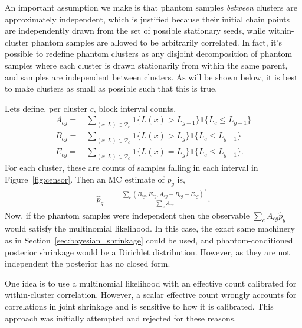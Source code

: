\documentclass[pdflatex,sn-basic,icol]{sn-jnl}
\theoremstyle{plain}
\theoremstyle{definition}
\begin{document}
An important assumption we make is that phantom samples \textit{between} clusters are approximately independent, which is justified because their initial chain points are independently drawn from the set of possible stationary seeds, while within-cluster phantom samples are allowed to be arbitrarily correlated.
In fact, it's possible to redefine phantom clusters as any disjoint decomposition of phantom samples where each cluster is drawn stationarily from within the same parent, and samples are independent between clusters.
As will be shown below, it is best to make clusters as small as possible such that this is true.

Lets define, per cluster $c$, block interval counts,
\begin{align}
    A_{cg} =&\, \sum_{(x, L) \in \mathcal{P}_c} \mathbf{1}\{L(x) > L_{g-1}\} \mathbf{1}\{L_{c} \le L_{g-1}\}\\
    B_{cg} =&\, \sum_{(x, L) \in \mathcal{P}_c} \mathbf{1}\{L(x) > L_{g}\} \mathbf{1}\{L_{c} \le L_{g-1}\}\\
    E_{cg} =&\, \sum_{(x, L) \in \mathcal{P}_c} \mathbf{1}\{L(x) = L_{g}\} \mathbf{1}\{L_{c} \le L_{g-1}\}.
\end{align}
For each cluster, these are counts of samples falling in each interval in Figure~\ref{fig:censor}.
Then an MC estimate of $p_g$ is,
\begin{align}
    \hat{p}_{g} =& \frac{\sum_c \left( B_{cg}, E_{cg}, A_{cg} - B_{cg} - E_{cg}\right)^\top}{\sum_c A_{cg}}.
\end{align}
Now, if the phantom samples were independent then the observable $\sum_c A_{cg} \hat{p}_g$ would satisfy the multinomial likelihood.
In this case, the exact same machinery as in Section~\ref{sec:bayesian_shrinkage} could be used, and phantom-conditioned posterior shrinkage would be a Dirichlet distribution.
However, as they are not independent the posterior has no closed form.

One idea is to use a multinomial likelihood with an effective count calibrated for within-cluster correlation.
However, a scalar effective count wrongly accounts for correlations in joint shrinkage and is sensitive to how it is calibrated.
This approach was initially attempted and rejected for these reasons.
\end{document}
